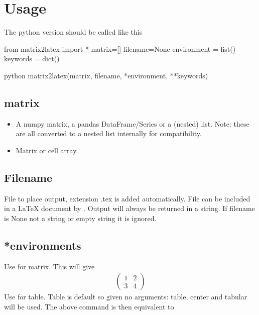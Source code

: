 \section{Usage}
The python version should be called like this
\begin{pycode}
from matrix2latex import *
matrix=[]
filename=None
environment = list()
keywords = dict()
\end{pycode}
\begin{pygments}{python}
matrix2latex(matrix, filename, *environment, **keywords)
\end{pygments}

  
\subsection{matrix}
\begin{itemize}
\item[Python:] A numpy matrix, a pandas DataFrame/Series or a (nested) list. 
  Note: these are all converted to a nested list internally for compatibility.
\item[Matlab:] Matrix or cell array.
\end{itemize}
\subsection{Filename}
  File to place output, extension .tex is added automatically. File can be included in a LaTeX
  document by \verb!!. Output will always be returned in a string. If filename is None
  not a string or empty string it is ignored.
  
\subsection{*environments}
  Use 
 for matrix.
  This will give
  \begin{align*}
    \begin{pmatrix}
      1 & 2 \\
      3 & 4
    \end{pmatrix}
  \end{align*}
  Use 
 for table.
  Table is default so given no arguments: table, center and tabular will be used.
  The above command is then equivalent to \\

